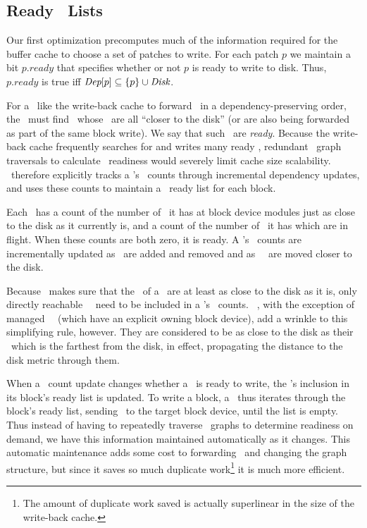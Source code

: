 
\subsection{Ready \ChDesc\ Lists}
\label{sec:patch:readylist}

\newcommand{\PReady}[1]{\ensuremath{#1.\textit{ready}}}

Our first optimization precomputes much of the information required for the
buffer cache to choose a set of patches to write.
%
For each patch $p$ we maintain a bit $\PReady{p}$ that specifies whether or
not $p$ is ready to write to disk.
%
Thus, $\PReady{p}$ is true iff $\PDepset{p} \subseteq \{p\} \cup \PDisk$.
%



For a \module\ like the write-back cache to forward \chdescs\ in a
dependency-preserving order, the \module\ must find \chdescs\ whose \befores\
are all ``closer to the disk'' (or are also being forwarded as part of the same
block write). We say that such \chdescs\ are \emph{ready}. Because the
write-back cache frequently searches for and writes many ready \chdescs,
redundant \chdesc\ graph traversals to calculate \chdesc\ readiness would
severely limit cache size scalability. \Kudos\ therefore explicitly tracks a
\chdesc's \before\ counts through incremental dependency updates, and uses these
counts to maintain a \chdesc\ ready list for each block.

Each \chdesc\ has a count of the number of \befores\ it has at block device
modules just as close to the disk as it currently is, and a count of the number
of \befores\ it has which are in flight. When these counts are both zero, it is
ready. A \chdesc's \before\ counts are incrementally updated as \befores\ are
added and removed and as \beforing\ \chdescs\ are moved closer to the disk.

Because \Kudos\ makes sure that the \befores\ of a \chdesc\ are at least as
close to the disk as it is, only directly reachable \beforing\ \chdescs\ need to
be included in a \chdesc's \before\ counts. \Noop\ \chdescs, with the exception
of managed \noop\ \chdescs\ (which have an explicit owning block device), add a
wrinkle to this simplifying rule, however. They are considered to be as close to
the disk as their \before\ which is the farthest from the disk, in effect,
propagating the distance to the disk metric through them.

When a \before\ count update changes whether a \chdesc\ is ready to write, the
\chdesc's inclusion in its block's ready list is updated. To write a block, a
\module\ thus iterates through the block's ready list, sending \chdescs\ to the
target block device, until the list is empty. Thus instead of having to
repeatedly traverse \chdesc\ graphs to determine readiness on demand, we have
this information maintained automatically as it changes. This automatic
maintenance adds some cost to forwarding \chdescs\ and changing the graph
structure, but since it saves so much duplicate work\footnote{The amount of
duplicate work saved is actually superlinear in the size of the write-back
cache.} it is much more efficient.
